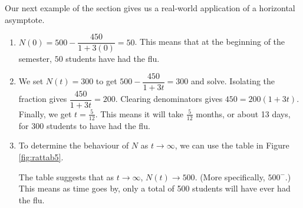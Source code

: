 \medskip

Our next example of the section gives us a real-world application of a horizontal asymptote.


\medskip

{
\begin{enumerate}

\item  $N(0) = 500 - \dfrac{450}{1+3(0)} = 50$.  This means that at the beginning of the semester, $50$ students have had the flu.

\item  We set $N(t) = 300$ to get $500 - \dfrac{450}{1+3t} = 300$ and solve.  Isolating the fraction gives $\dfrac{450}{1+3t} = 200$.  Clearing denominators gives $450 = 200(1+3t)$.  Finally, we get $t = \frac{5}{12}$.  This means it will take $\frac{5}{12}$ months, or about 13 days, for $300$ students to have had the flu.

\item  To determine the behaviour of $N$ as $t\rightarrow \infty$, we can use the table in Figure \ref{fig:rattab5}.

  
The table suggests that as $t \rightarrow \infty$, $N(t) \rightarrow 500$. (More specifically, $500^{-}$.)  This means as time goes by, only a total of 500 students will have ever had the flu.
\end{enumerate}}

